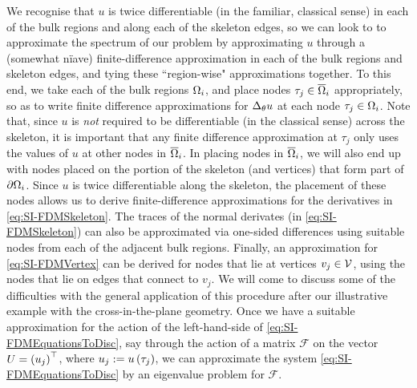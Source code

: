 We recognise that $u$ is twice differentiable (in the familiar, classical sense) in each of the bulk regions and along each of the skeleton edges, so we can look to to approximate the spectrum of our problem by approximating $u$ through a (somewhat n{\"i}ave) finite-difference approximation in each of the bulk regions and skeleton edges, and tying these ``region-wise" approximations together.
To this end, we take each of the bulk regions $\Omega_i$, and place nodes $\tau_j\in\overline{\Omega}_{i}$ appropriately, so as to write finite difference approximations for $\Delta_{\theta}u$ at each node $\tau_j\in\Omega_i$.
Note that, since $u$ is \emph{not} required to be differentiable (in the classical sense) across the skeleton, it is important that any finite difference approximation at $\tau_j$ only uses the values of $u$ at other nodes in $\overline{\Omega}_{i}$.
In placing nodes in $\overline{\Omega}_{i}$, we will also end up with nodes placed on the portion of the skeleton (and vertices) that form part of $\partial\Omega_i$.
Since $u$ is twice differentiable along the skeleton, the placement of these nodes allows us to derive finite-difference approximations for the derivatives in \eqref{eq:SI-FDMSkeleton}.
The traces of the normal derivates (in \eqref{eq:SI-FDMSkeleton}) can also be approximated via one-sided differences using suitable nodes from each of the adjacent bulk regions.
Finally, an approximation for \eqref{eq:SI-FDMVertex} can be derived for nodes that lie at vertices $v_j\in\mathcal{V}$, using the nodes that lie on edges that connect to $v_j$.
We will come to discuss some of the difficulties with the general application of this procedure after our illustrative example with the cross-in-the-plane geometry.
Once we have a suitable approximation for the action of the left-hand-side of \eqref{eq:SI-FDMEquationsToDisc}, say through the action of a matrix $\mathcal{F}$ on the vector $U = \left( u_j \right)^\top$, where $u_j:=u\left( \tau_j \right)$, we can approximate the system \eqref{eq:SI-FDMEquationsToDisc} by an eigenvalue problem for $\mathcal{F}$.

